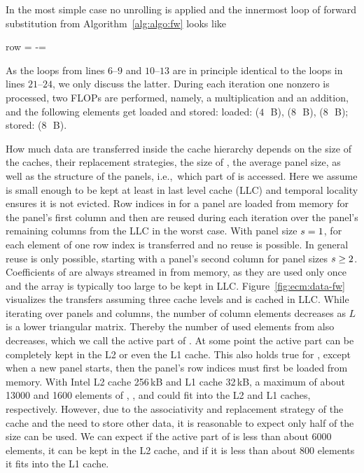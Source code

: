 In the most simple case no unrolling is applied and the innermost loop of
forward substitution from Algorithm~\ref{alg:algo:fw} looks like
%
\begin{algorithmic}[1]
  \setcounter{ALG@line}{20}
      \State row = \nindx[i++]
      \State \nr[row] -= \nr[j] \nlnz[k]
  \EndFor
\end{algorithmic}%
\noindent%
%
As the loops from lines $6$--$9$ and $10$--$13$ are in principle identical to
the loops in lines $21$--$24$, we only discuss the latter.
%
During each iteration one nonzero is processed, two FLOPs are performed,
namely, a multiplication and an addition, and the following elements get
loaded and stored: loaded: \vindx{} ($4$~\,B), \vr{} ($8$~\,B), \vlnz{}
($8$~\,B); stored: \vr{} ($8$~\,B).

How much data are transferred inside the cache hierarchy depends on the size of
the caches, their replacement strategies, the size of \vr{}, the average panel
size, as well as the structure of the panels, i.e.,\ which part of \vr{} is
accessed.
Here we assume \vr{} is small enough to be kept at least in last level cache
(LLC) and temporal locality ensures it is not evicted.
%
Row indices in \vindx{} for a panel are loaded from memory for the panel's first
column and then are reused during each iteration over the panel's remaining
columns from the LLC in the worst case.
With panel size $s=1$, for each element of \vlnz{} one row index is
transferred and no reuse is possible.
In general reuse is only possible, starting with a panel's second column for
panel sizes $s \ge 2$.
%
Coefficients of \vlnz{} are always streamed in from memory, as they are
used only once and the array \vlnz{} is typically too large to be kept in LLC.
Figure~\ref{fig:ecm:data-fw} visualizes the transfers assuming three cache levels
and \vr{} is cached in LLC.
While iterating over panels and columns, the number of column elements
decreases as $L$ is a lower triangular matrix.
Thereby the number of used elements from \vr{} also decreases, which we call the
active part of \vr{}.
At some point the active part can be completely kept in the L2 or even the L1 cache.
This also holds true for \vindx{}, except when a new panel starts, then
the panel's row indices must first be loaded from memory.
With Intel L2 cache 256\,kB and L1 cache 32\,kB, a maximum of about 13000 and 1600 elements of \vr{}, \vindx{}, and \vlnz{} could fit into the L2 and L1 caches, respectively. However, due to the associativity and replacement strategy of the cache and the need to store other data, it is reasonable to expect only half of the size can be used. We can expect if the active part of \vr{} is less than about 6000 elements, it can be kept in the L2 cache, and if it is less than about 800 elements it fits into the L1 cache.
\clearpage

